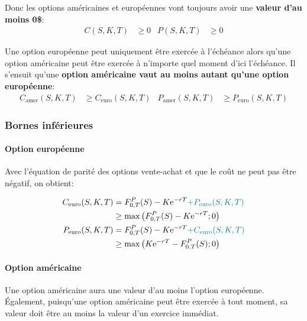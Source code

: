 \documentclass[10pt, french]{article}
\begin{document}
\begin{multicols*}{2}
Donc les options américaines et européennes vont toujours avoir une \textbf{valeur d'au moins 0\$}:
\begin{align*}
	C(S, K, T) &\geq	0	&
	P(S, K, T) &\geq	0	
\end{align*}

Une option européenne peut uniquement être exercée à l'échéance alors qu'une option américaine peut être exercée à n'importe quel moment d'ici l'échéance. Il s'ensuit qu'une \textbf{option américaine vaut au moins autant qu'une option européenne}:
\begin{align*}
	C_{\text{amer}}(S, K, T)	&\geq	C_{\text{euro}}(S, K, T)	&
	P_{\text{amer}}(S, K, T)	&\geq	P_{\text{euro}}(S, K, T)	
\end{align*}

\subsubsection*{Bornes inférieures}
\paragraph{Option européenne}	Avec l'équation de parité des options vente-achat et que le coût ne peut pas être négatif, on obtient:

\begin{align*}
	C_{\text{euro}}(S, K, T)	
	&=	F_{0, T}^{P}(S) - K\textrm{e}^{-rT} \textcolor{teal}{+ P_{\text{euro}}(S, K, T)}	\\
	&\geq	\max\left(F_{0, T}^{P}(S) - K\textrm{e}^{-rT}; 0\right)	\\
	P_{\text{euro}}(S, K, T)	
	&=	F_{0, T}^{P}(S) - K\textrm{e}^{-rT} \textcolor{teal}{+ C_{\text{euro}}(S, K, T)}	\\
	&\geq	\max\left(K\textrm{e}^{-rT} - F_{0, T}^{P}(S); 0\right)
\end{align*}

\paragraph{Option américaine}	Une option américaine aura une valeur d'au moins l'option européenne. Également, puisqu'une option américaine peut être exercée à tout moment, sa valeur doit être au moins la valeur d'un exercice immédiat.


\end{multicols*}
\end{document}
